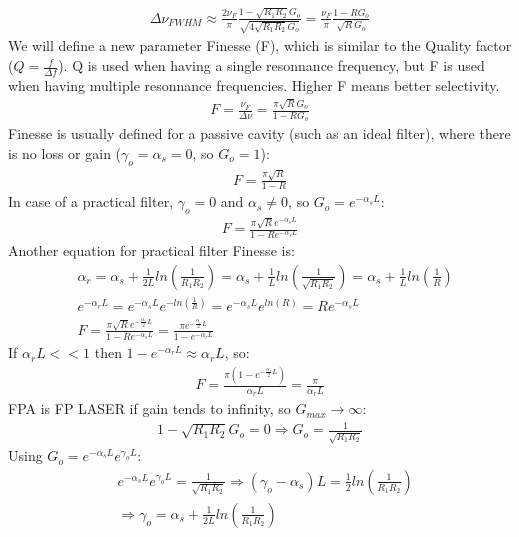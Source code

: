 \documentclass[11pt]{article}
\begin{document}
\begin{align*}
    \Delta \nu_{FWHM} \approx \frac{2 \nu_F}{\pi}  \frac{1 - \sqrt{R_1 R_2} G_o}{\sqrt{4 \sqrt{R_1 R_2} G_o}} = \frac{\nu_F}{\pi} \frac{1 - R G_o}{\sqrt{R} G_o}
\end{align*}
We will define a new parameter Finesse (F), which is similar to the Quality factor ($Q = \frac{f}{\Delta f}$). Q is used when having a single resonnance frequency, but F is used when having multiple resonnance frequencies. Higher F means better selectivity.
\begin{align*}
    F = \frac{\nu_F}{\Delta \nu} = \frac{\pi \sqrt{R} G_o}{1 - R G_o}
\end{align*}
Finesse is usually defined for a passive cavity (such as an ideal filter), where there is no loss or gain ($\gamma_o = \alpha_s = 0$, so $G_o = 1$):
\begin{align*}
    F = \frac{\pi \sqrt{R}}{1 - R}
\end{align*}
In case of a practical filter, $\gamma_o = 0$ and $\alpha_s \neq 0$, so $G_o = e^{-\alpha_s L}$:
\begin{align*}
    F = \frac{\pi \sqrt{R} e^{-\alpha_s L}}{1 - R e^{-\alpha_s L}}
\end{align*}
Another equation for practical filter Finesse is:
\begin{align*}
    & \alpha_r = \alpha_s + \frac{1}{2L} ln\left(\frac{1}{R_1 R_2}\right) = \alpha_s + \frac{1}{L} ln\left(\frac{1}{\sqrt{R_1 R_2}}\right) = \alpha_s + \frac{1}{L} ln\left(\frac{1}{R}\right) \\
    & e^{-\alpha_r L} = e^{-\alpha_s L} e^{-ln\left(\frac{1}{R}\right)} = e^{-\alpha_s L} e^{ln(R)} = R e^{-\alpha_s L} \\
    & F = \frac{\pi \sqrt{R} e^{-\frac{\alpha_s}{2} L}}{1 - R e^{-\alpha_s L}} = \frac{\pi e^{-\frac{\alpha_r}{2} L}}{1 - e^{-\alpha_r L}}
\end{align*}
If $\alpha_r L << 1$ then $1 - e^{-\alpha_r L} \approx \alpha_r L$, so:
\begin{align*}
    F = \frac{\pi (1 - e^{-\frac{\alpha_r}{2} L})}{\alpha_r L} = \frac{\pi}{\alpha_r L} 
\end{align*}
FPA is FP LASER if gain tends to infinity, so $G_{max} \rightarrow \infty$:
\begin{align*}
    1 - \sqrt{R_1 R_2} G_o = 0 \Rightarrow G_o = \frac{1}{\sqrt{R_1 R_2}}
\end{align*}
Using $G_o = e^{-\alpha_s L} e^{\gamma_o L}$:
\begin{align*}
    & e^{-\alpha_s L} e^{\gamma_o L} = \frac{1}{\sqrt{R_1 R_2}} \Rightarrow (\gamma_o - \alpha_s)L = \frac{1}{2} ln\left(\frac{1}{R_1 R_2}\right) \\
    & \Rightarrow \gamma_o = \alpha_s + \frac{1}{2L} ln\left(\frac{1}{R_1 R_2}\right) 
\end{align*}
\end{document}
